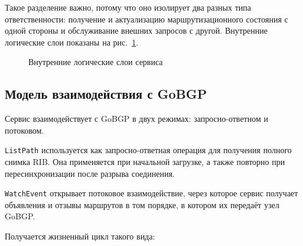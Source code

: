 Такое разделение важно, потому что оно изолирует два разных типа
ответственности: получение и актуализацию маршрутизационного состояния
с одной стороны и обслуживание внешних запросов с другой. Внутренние
логические слои показаны на рис.~\ref{fig:arch-layers}.

\begin{figure}[ht]
\centering
{}
\caption{Внутренние логические слои сервиса}
\label{fig:arch-layers}
\end{figure}

\subsection{Модель взаимодействия с GoBGP}
\label{sec:gobgp-interaction}

Сервис взаимодействует с GoBGP в двух режимах: запросно-ответном и
потоковом.

\texttt{ListPath} используется как запросно-ответная операция для
получения полного снимка RIB. Она применяется при начальной загрузке, а
также повторно при пересинхронизации после разрыва соединения.

\texttt{WatchEvent} открывает потоковое взаимодействие, через которое
сервис получает объявления и отзывы маршрутов в том порядке, в котором
их передаёт узел GoBGP.

Получается жизненный цикл такого вида:

